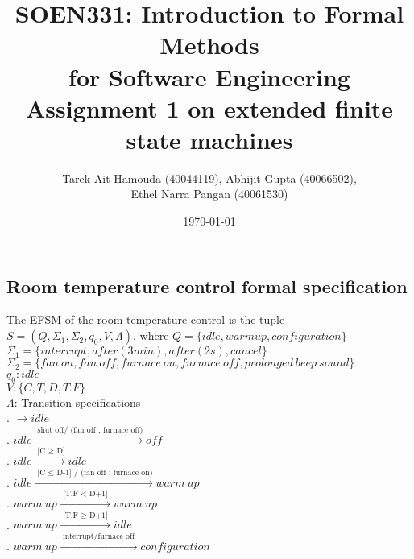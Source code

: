 \documentclass[12pt]{article}
\title{SOEN331: Introduction to Formal Methods\\for Software Engineering\\
Assignment 1 on extended finite state machines}
\author{Tarek Ait Hamouda (40044119), Abhijit Gupta (40066502),\\ 
Ethel Narra Pangan (40061530)}
\date{\today}
\begin{document}
\begin{spacing}{1.5}

\maketitle

\section{Room temperature control formal specification}

\noindent The EFSM of the room temperature control is the tuple $S = (Q, \Sigma_1, \Sigma_2, q_0, V, \Lambda)$, where
\noindent $Q = \{idle, warm up, configuration\}$\\
\noindent $\Sigma_1 = \{interrupt, after(3 min), after(2 s), cancel\}$\\
\noindent $\Sigma_2 = \{fan~on, fan~off, furnace~on, furnace~off, prolonged~beep~sound\}$\\
\noindent $q_0: idle$\\
\noindent $V: \{C, T, D, T.F\}$\\
\noindent $\Lambda$: Transition specifications\\
. $\rightarrow idle$\\
. $idle \xrightarrow {\text { shut off/ (fan off ; furnace off)}} off$\\
. $idle \xrightarrow {\text { [C $\geq$ D]}} idle$\\
. $idle \xrightarrow {\text { [C $\leq$ D-1] / (fan off ; furnace on)}} warm~up$\\
. $warm~up \xrightarrow {\text { [T.F $<$ D+1] }} warm~up$\\
. $warm~up \xrightarrow {\text { [T.F $\geq$ D+1] }} idle$\\
. $warm~up \xrightarrow {\text { interrupt/furnace off }} configuration$\\


\end{spacing}
\end{document}
